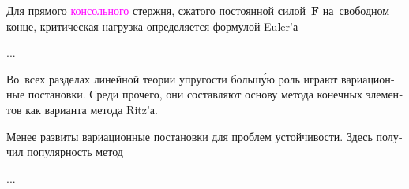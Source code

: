 

\begin{otherlanguage}{russian}

Для прямого \textcolor{magenta}{консольного} стержня, сжатого постоянной силой~$\bm{F}$ на~свободном конце, критическая нагрузка определяется формулой Euler’а

...



\end{otherlanguage}



\begin{otherlanguage}{russian}

Во~всех разделах линейной теории упругости больш\'{у}ю роль играют вариационные постановки.
Среди прочего, они составляют основу метода конечных элементов как варианта метода Ritz’а.

Менее развиты вариационные постановки для проблем устойчивости.
Здесь получил популярность метод

...



\end{otherlanguage}



